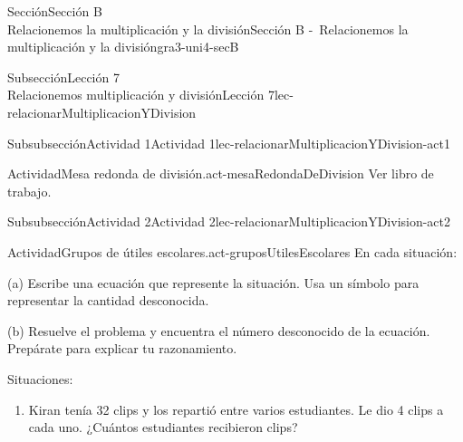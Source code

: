 \begin{sectionptx}{Sección}{{\Large Sección B\\}Relacionemos la multiplicación y la división}{}{Sección B -~Relacionemos la multiplicación y la división}{}{}{gra3-uni4-secB}
\begin{subsectionptx}{Subsección}{{\normalsize Lección 7\\[-0.05cm]}Relacionemos multiplicación y división}{}{Lección 7}{}{}{lec-relacionarMultiplicacionYDivision}
\begin{subsubsectionptx}{Subsubsección}{Actividad 1}{}{Actividad 1}{}{}{lec-relacionarMultiplicacionYDivision-act1}
\begin{activity}{Actividad}{Mesa redonda de división.}{act-mesaRedondaDeDivision}
Ver libro de trabajo.
\end{activity}%
\end{subsubsectionptx}
%
%
\typeout{************************************************}
\typeout{************************************************}
%
\begin{subsubsectionptx}{Subsubsección}{Actividad 2}{}{Actividad 2}{}{}{lec-relacionarMultiplicacionYDivision-act2}
\begin{activity}{Actividad}{Grupos de útiles escolares.}{act-gruposUtilesEscolares}%
En cada situación:%
\par
(a) Escribe una ecuación que represente la situación. Usa un símbolo para representar la cantidad desconocida.%
\par
(b) Resuelve el problema y encuentra el número desconocido de la ecuación. Prepárate para explicar tu razonamiento.%
\par
Situaciones:%
%
\begin{enumerate}
\item{}Kiran tenía 32 clips y los repartió entre varios estudiantes. Le dio 4 clips a cada uno. ¿Cuántos estudiantes recibieron clips?%

\end{enumerate}
\end{activity}
\end{subsubsectionptx}
\end{subsectionptx}
\end{sectionptx}
